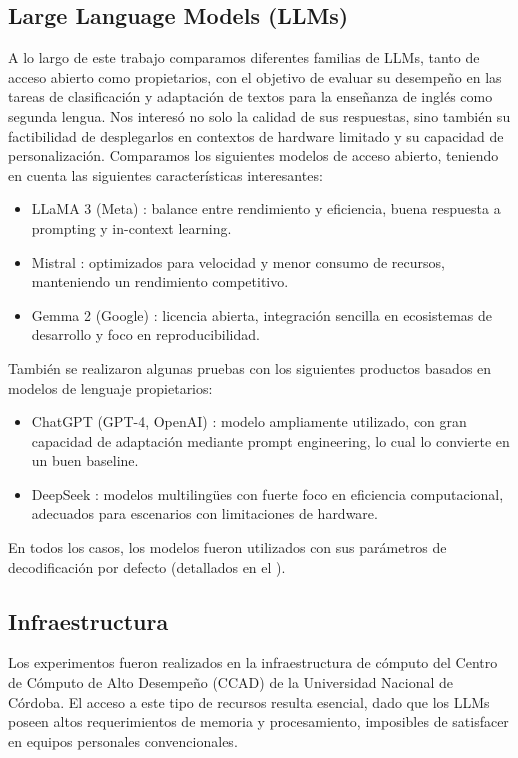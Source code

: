 \subsection{Large Language Models (LLMs)}\label{subsec:llms}
A lo largo de este trabajo comparamos diferentes familias de LLMs, tanto de acceso abierto como propietarios, con el objetivo de evaluar su desempeño en las tareas de clasificación y adaptación de textos para la enseñanza de inglés como segunda lengua. Nos interesó no solo la calidad de sus respuestas, sino también su factibilidad de desplegarlos en contextos de hardware limitado y su capacidad de personalización.
Comparamos los siguientes modelos de acceso abierto, teniendo en cuenta las siguientes características interesantes:
\begin{itemize}
    \item LLaMA 3 (Meta) \parencite{llama}: balance entre rendimiento y eficiencia, buena respuesta a prompting y in-context learning.
    \item Mistral \parencite{mistral}: optimizados para velocidad y menor consumo de recursos, manteniendo un rendimiento competitivo.
    \item Gemma 2 (Google) \parencite{gemma}: licencia abierta, integración sencilla en ecosistemas de desarrollo y foco en reproducibilidad.
\end{itemize}

También se realizaron algunas pruebas con los siguientes productos basados en modelos de lenguaje propietarios:
\begin{itemize}
    \item ChatGPT (GPT-4, OpenAI) \parencite{gpt}: modelo ampliamente utilizado, con gran capacidad de adaptación mediante prompt engineering, lo cual lo convierte en un buen baseline.
    \item DeepSeek \parencite{deepsek}: modelos multilingües con fuerte foco en eficiencia computacional, adecuados para escenarios con limitaciones de hardware.
\end{itemize}

En todos los casos, los modelos fueron utilizados con sus parámetros de decodificación por defecto (detallados en el ).

\subsection{Infraestructura}\label{subsec:hardware}
Los experimentos fueron realizados en la infraestructura de cómputo del Centro de Cómputo de Alto Desempeño (CCAD) \parencite{ccad} de la Universidad Nacional de Córdoba. El acceso a este tipo de recursos resulta esencial, dado que los LLMs poseen altos requerimientos de memoria y procesamiento, imposibles de satisfacer en equipos personales convencionales.

